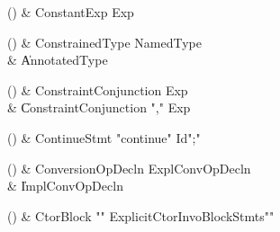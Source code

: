 \begin{bbgrammarappendix}{3.9in}

() & ConstantExp \label{prod:ConstantExp}  \: Exp  \\


\end{bbgrammarappendix}

\begin{bbgrammarappendix}{3.5in}

() & ConstrainedType \label{prod:ConstrainedType}  \: NamedType  \\

 &    \| AnnotatedType \\

\end{bbgrammarappendix}

\begin{bbgrammarappendix}{2.9in}

() & ConstraintConjunction \label{prod:ConstraintConjunction}  \: Exp  \\

 &    \| ConstraintConjunction \xcd"," Exp \\

\end{bbgrammarappendix}

\begin{bbgrammarappendix}{3.8in}

() & ContinueStmt \label{prod:ContinueStmt}  \: \xcd"continue" Id\opt \xcd";"  \\


\end{bbgrammarappendix}

\begin{bbgrammarappendix}{3.3in}

() & ConversionOpDecln \label{prod:ConversionOpDecln}  \: ExplConvOpDecln  \\

 &    \| ImplConvOpDecln \\

\end{bbgrammarappendix}

\begin{bbgrammarappendix}{4.1in}

() & CtorBlock \label{prod:CtorBlock}  \: \xcd"{" ExplicitCtorInvo\opt BlockStmts\opt \xcd"}"  \\


\end{bbgrammarappendix}

